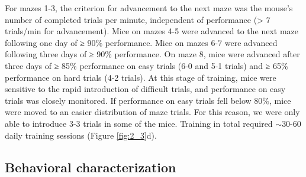 \bigskip
For mazes 1-3, the criterion for advancement to the next maze was the mouse’s number of completed trials per minute, independent of performance (> 7 trials/min for advancement). Mice on mazes 4-5 were advanced to the next maze following one day of ≥ 90\% performance. Mice on mazes 6-7 were advanced following three days of ≥ 90\% performance. On maze 8, mice were advanced after three days of ≥ 85\% performance on easy trials (6-0 and 5-1 trials) and ≥ 65\% performance on hard trials (4-2 trials). At this stage of training, mice were sensitive to the rapid introduction of difficult trials, and performance on easy trials was closely monitored. If performance on easy trials fell below 80\%, mice were moved to an easier distribution of maze trials. For this reason, we were only able to introduce 3-3 trials in some of the mice. Training in total required $\sim$30-60 daily training sessions (Figure \ref{fig:2_3}d). 

\subsection{Behavioral characterization} \label{sec:fixed_behav}

